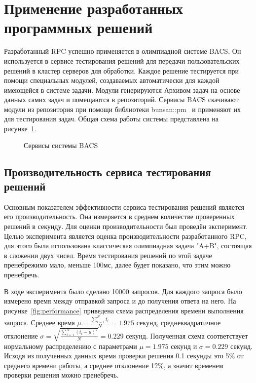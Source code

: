 
\section{Применение разработанных программных решений}
Разработанный RPC успешно применяется в олимпиадной системе BACS.
Он используется в сервисе тестирования решений для передачи пользовательских
решений в кластер серверов для обработки. Каждое решение тестируется
при помощи специальных модулей, создаваемых автоматически
для каждой имеющейся в системе задачи. Модули генерируются Архивом задач
на основе данных самих задач и помещаются в репозиторий. Сервисы BACS
скачивают модули из репозитория при помощи библиотеки bunsan::pm~\cite{bunsanpm}
и применяют их для тестирования задач. Общая схема работы системы
представлена на рисунке~\ref{fig:bacsservice}.

\begin{figure}[H]
    \centering
    
    \caption{Сервисы системы BACS}
    \label{fig:bacsservice}
\end{figure}

\subsection{Производительность сервиса тестирования решений}
Основным показателем эффективности сервиса тестирования решений является
его производительность. Она измеряется в среднем количестве проверенных решений
в секунду. Для оценки производительности был проведён эксперимент.
Целью эксперимента является оценка производительности разработанного RPC,
для этого была использована классическая олимпиадная задача "A+B", состоящая
в сложении двух чисел. Время тестирования решений по этой задаче пренебрежимо
мало, меньше 100мс, далее будет показано, что этим можно пренебречь.

В ходе эксперимента было сделано 10000 запросов. Для каждого запроса
было измерено время между отправкой запроса и до получения ответа на него.
На рисунке~\ref{fig:performance} приведена схема распределения времени
выполнения запроса. Среднее время $\mu = \frac{\sum_{i=1}^N t_i}{N} = 1.975$
секунд, среднеквадратичное отклонение $\sigma =
\sqrt{\frac{\sum_{i=1}^N \left(t_i - \mu\right)^2}{N}} = 0.229$ секунд.
Полученная схема соответствует нормальному распределению с параметрами
$\mu = 1.975$ секунд и $\sigma = 0.229$ секунд. Исходя из полученных данных
время проверки решения 0.1 секунды это 5\% от среднего времени работы,
а среднее отклонение 12\%, а значит временем проверки решения можно пренебречь.

